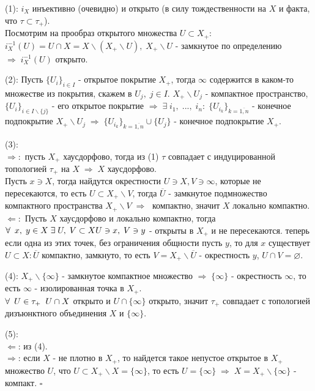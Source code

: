 \documentclass[../../main.tex]{subfiles}
\begin{document}
(1): $i_X$ инъективно (очевидно) и открыто (в силу тождественности на $X$ и факта, что $\tau\subset\tau_+$).\\
Посмотрим на прообраз открытого множества $U\subset X_+$: $i_X^{-1} (U) = U\cap X = X\backslash(X_+\backslash U),\; X_+\backslash U$ - замкнутое по определению $\Rightarrow\; i_X^{-1} (U)$ открыто. 

(2): Пусть $\{U_i\}_{i\in I}$ - открытое покрытие $X_+$, тогда $\infty$ содержится в каком-то множестве из покрытия, скажем в $U_j,\;j\in I$. $X_+\backslash U_j$ - компактное пространство, $\{U_i\}_{i\in I\backslash\{j\}}$ - его открытое покрытие $\Rightarrow\; \exists\; i_1,\;...,\;i_n:\; \{U_{i_k}\}_{k = \overline{1,n}}$ - конечное подпокрытие $X_+\backslash U_j \;\Rightarrow\; \{U_{i_k}\}_{k = \overline{1,n}} \cup\{U_j\}$ - конечное подпокрытие $X_+$. 

(3):\\
$\Rightarrow:$ пусть $X_+$ хаусдорфово, тогда из (1) $\tau$ совпадает с индуцированной топологией $\tau_+$ на $X\;\Rightarrow\;X$ хаусдорфово.\\
Пусть $x\ni X$, тогда найдутся окрестности $U\ni X, V\ni\infty$, которые не пересекаются, то есть $U\subset X_+\backslash V$, тогда $\overline U$ - замкнутое подмножество компактного пространства $X_+\backslash V\;\Rightarrow\; $ компактно, значит $X$ локально компактно.\\
$\Leftarrow:$ Пусть $X$ хаусдорфово и локально компактно, тогда $\forall\:\; x,\; y\in X\; \exists\; U,\;V\subset X U\ni x,\; V\ni y $ - открыты в $X_+$ и не пересекаются. теперь если одна из этих точек, без ограничения общности пусть $y$, то для $x$ существует $U\subset X: \overline{U}$ компактно, замкнуто, то есть $V = X_+\backslash \overline U$ - окрестность $y$, $U\cap V = \varnothing$.

(4): $X_+\backslash \{\infty\}$ - замкнутое компактное множество $\Rightarrow\;\{\infty\}$ - окрестность $\infty$, то есть $\infty$ - изолированная точка в $X_+$.\\
$\forall\:\; U\in \tau_+ \;\; U\cap X$ открыто и $U\cap \{\infty\}$ открыто, значит $\tau_+$ совпадает с топологией дизъюнктного объединения $X$ и $\{\infty\}$.

(5):\\
$\Leftarrow$: из (4).\\
$\Rightarrow$: если $X$ - не плотно в $X_+$, то найдется такое непустое открытое в $X_+$ множество $U$, что $U\subset X_+\backslash X = \{\infty\}$, то есть $U = \{\infty\}\;\Rightarrow\;X = X_+\backslash \{\infty\}$ - компакт. $\square$
\end{document}

